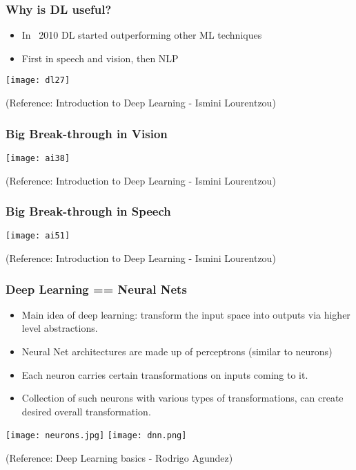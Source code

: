 \begin{frame}[fragile] \frametitle{Why is DL useful?}
\begin{itemize}
\item In ~2010 DL started outperforming other ML techniques 
\item First in speech and vision, then NLP
\end{itemize}
\begin{center}
\texttt{[image: dl27]}
\end{center}
\tiny{(Reference: Introduction to Deep Learning - Ismini Lourentzou)}
\end{frame}

\begin{frame}[fragile] \frametitle{Big Break-through in Vision}
\begin{center}
\texttt{[image: ai38]}
\end{center}
\tiny{(Reference: Introduction to Deep Learning - Ismini Lourentzou)}
\end{frame}

\begin{frame}[fragile] \frametitle{Big Break-through in Speech}
\begin{center}
\texttt{[image: ai51]}
\end{center}
\tiny{(Reference: Introduction to Deep Learning - Ismini Lourentzou)}
\end{frame}

\begin{frame}[fragile] \frametitle{Deep Learning == Neural Nets }

\begin{itemize}
\item Main idea of deep learning: transform the input space into outputs via higher level abstractions.
\item Neural Net architectures are made up of perceptrons (similar to neurons) 
\item Each neuron carries certain transformations on inputs coming to it.
\item Collection of such neurons with various types of transformations, can create desired overall transformation.
\end{itemize}

\begin{center}
\texttt{[image: neurons.jpg]}
\texttt{[image: dnn.png]}
\end{center}

\tiny{(Reference: Deep Learning basics - Rodrigo Agundez)}

\end{frame}

